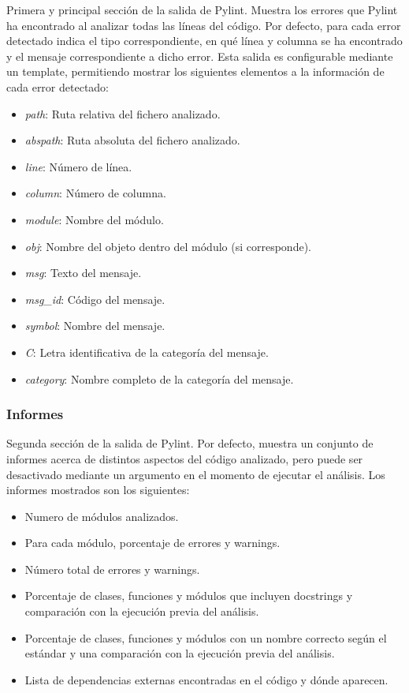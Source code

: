 \documentclass[a4paper, 12pt]{book}
\begin{document}
Primera y principal sección de la salida de Pylint. Muestra los errores que Pylint ha encontrado al analizar todas las líneas del código.
Por defecto, para cada error detectado indica el tipo correspondiente, en qué línea y columna se ha encontrado y el mensaje correspondiente a dicho error.
Esta salida es configurable mediante un template, permitiendo mostrar los siguientes elementos a la información de cada error detectado:
\begin{itemize}
	\item \textit{path}: Ruta relativa del fichero analizado.
	\item \textit{abspath}: Ruta absoluta del fichero analizado.
	\item \textit{line}: Número de línea.
	\item \textit{column}: Número de columna.
	\item \textit{module}: Nombre del módulo.
	\item \textit{obj}: Nombre del objeto dentro del módulo (si corresponde).
	\item \textit{msg}: Texto del mensaje.
	\item \textit{msg\_id}: Código del mensaje.
	\item \textit{symbol}: Nombre del mensaje.
	\item \textit{C}: Letra identificativa de la categoría del mensaje.
	\item \textit{category}: Nombre completo de la categoría del mensaje.
\end{itemize} 

\subsubsection{Informes}

Segunda sección de la salida de Pylint. 
Por defecto, muestra un conjunto de informes acerca de distintos aspectos del código analizado, pero puede ser desactivado mediante un argumento en el momento de ejecutar el análisis.
Los informes mostrados son los siguientes:
\begin{itemize}
	\item Numero de módulos analizados.
	\item Para cada módulo, porcentaje de errores y warnings.
	\item Número total de errores y warnings.
	\item Porcentaje de clases, funciones y módulos que incluyen docstrings y comparación con la ejecución previa del análisis.
	\item Porcentaje de clases, funciones y módulos con un nombre correcto según el estándar y una comparación con la ejecución previa del análisis.
	\item Lista de dependencias externas encontradas en el código y dónde aparecen.
\end{itemize}
\end{document}

